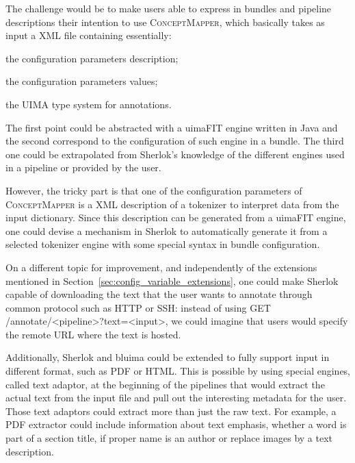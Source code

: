 \documentclass{article}
\newcommand{\ID}[1]{{\textsc{#1}}}
\newcommand{\REST}[1]{\textsf{#1}}
\begin{document}
The challenge would be to make users able to express in bundles and pipeline descriptions their
intention to use \ID{ConceptMapper}, which basically takes as input a XML file containing
essentially:
\begin{enumerate*}[label=\itshape\alph*\upshape)]

    \item the configuration parameters description;

    \item the configuration parameters values;

    \item the UIMA type system for annotations.

\end{enumerate*}
The first point could be abstracted with a uimaFIT engine written in Java and the second correspond
to the configuration of such engine in a bundle. The third one could be extrapolated from Sherlok's
knowledge of the different engines used in a pipeline or provided by the user.

However, the tricky part is that one of the configuration parameters of \ID{ConceptMapper} is a XML
description of a tokenizer to interpret data from the input dictionary. Since this description can
be generated from a uimaFIT engine, one could devise a mechanism in Sherlok to automatically
generate it from a selected tokenizer engine with some special syntax in bundle configuration.

On a different topic for improvement, and independently of the extensions mentioned in
Section~\ref{sec:config_variable_extensions}, one could make Sherlok capable of downloading the text
that the user wants to annotate through common protocol such as HTTP or SSH: instead of using
\REST{GET /annotate/<pipeline>?text=<input>}, we could imagine that users would specify the remote
URL where the text is hosted.

Additionally, Sherlok and bluima could be extended to fully support input in different format, such
as PDF or HTML. This is possible by using special engines, called text adaptor, at the beginning of
the pipelines that would extract the actual text from the input file and pull out the interesting
metadata for the user. Those text adaptors could extract more than just the raw text. For example, a
PDF extractor could include information about text emphasis, whether a word is part of a section
title, if proper name is an author or replace images by a text description.
\end{document}
